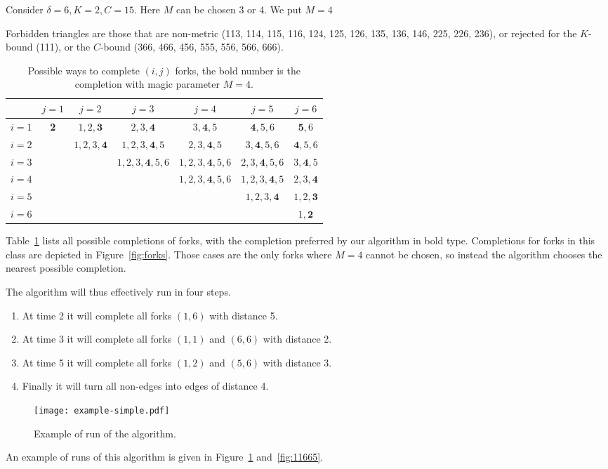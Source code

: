 \documentclass[11pt]{amsart}
\begin{document}
\begin{example}\rm
Consider $\delta=6, K=2, C=15$. Here $M$ can be chosen 3 or 4. We put $M=4$

Forbidden triangles are those that are non-metric (113, 114, 115, 116, 124, 125, 126, 135, 136, 146, 225, 226, 236), or rejected for the $K$-bound (111), or the $C$-bound (366, 466, 456, 555, 556, 566, 666).
\begin{table}[t]
\centering
\begin{tabular}{|c|c|c|c|c|c|c|}
\hline
&$j=1$&$j=2$&$j=3$&$j=4$&$j=5$ & $j=6$ \\ \hline
$i=1$&\textbf{2}&  $1,2,\textbf{3}$  &  $2,3,\textbf{4}$      & $3,\textbf{4},5$   		 & $\textbf{4},5,6$	   & $\textbf{5},6$  \\ 
$i=2$&					&  $1,2,3,\textbf{4}$&  $1,2,3,\textbf{4},5$  & $2,3,\textbf{4},5$ 		 & $3,\textbf{4},5,6$  & $\textbf{4},5,6$\\
$i=3$&					&  									 &  $1,2,3,\textbf{4},5,6$& $1,2,3,\textbf{4},5,6$ & $2,3,\textbf{4},5,6$& $3,\textbf{4},5$\\ 
$i=4$&					&  									 &  											&  $1,2,3,\textbf{4},5,6$& $1,2,3,\textbf{4},5$& $2,3,\textbf{4}$\\ 
$i=5$&					&  									 &  											&  									     & $1,2,3,\textbf{4}$  & $1,2,\textbf{3}$\\
$i=6$&					&  									 &  											&  											 &										 & $1, \textbf{2}$ \\ \hline
\end{tabular}
\caption{Possible ways to complete $(i,j)$ forks, the bold number is the completion with magic parameter $M = 4$.}
\label{tab:forks}
\end{table}
Table~\ref{tab:forks} lists all possible completions of forks, with the completion preferred by our algorithm in bold type. Completions for forks in this class are depicted in Figure~\ref{fig:forks}.
Those cases are the only forks where $M=4$ cannot be chosen, so instead the algorithm chooses the nearest possible completion. 

The algorithm will thus effectively run in four steps.
\begin{enumerate}
\item  At time 2 it will complete all forks $(1,6)$ with distance 5.
\item  At time 3 it will complete all forks $(1,1)$ and $(6,6)$ with distance 2.
\item  At time 5 it will complete all forks $(1,2)$ and $(5,6)$ with distance 3.
\item  Finally it will turn all non-edges into edges of distance 4.
\end{enumerate}
\begin{figure}
\centering
\texttt{[image: example-simple.pdf]}
\caption{Example of run of the algorithm.}
\label{fig:example}
\end{figure}%
 An example of runs of this algorithm is given in Figure~\ref{fig:example} and~\ref{fig:11665}.
\end{example}
\end{document}
